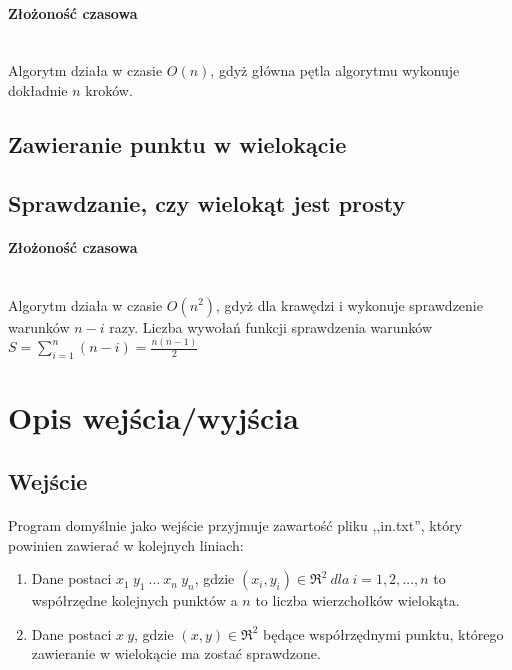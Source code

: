 \documentclass{article}
\begin{document}
\paragraph{Złożoność czasowa} \mbox{}\\
Algorytm działa w czasie \(O(n)\), gdyż główna pętla algorytmu wykonuje dokładnie \(n\) kroków.

\subsection{Zawieranie punktu w wielokącie}


\subsection{Sprawdzanie, czy wielokąt jest prosty}

\paragraph{Złożoność czasowa} \mbox{}\\
Algorytm działa w czasie $O(n^2)$, gdyż dla krawędzi i wykonuje sprawdzenie warunków $n-i$ razy. Liczba wywołań funkcji sprawdzenia warunków $S = \sum\limits_{i=1}^n (n-i) = \frac{n(n-1)}{2}$

\section{Opis wejścia/wyjścia}

\subsection{Wejście}

\paragraph{}
Program domyślnie jako wejście przyjmuje zawartość pliku ,,in.txt'', który powinien zawierać w kolejnych liniach:
\begin{enumerate}
\item Dane postaci \(x_1\ y_1\ ...\ x_n\ y_n\), gdzie \((x_i,y_i) \in \Re^{2} \ dla\ i=1,2,...,n\) to współrzędne kolejnych punktów a \(n\) to liczba wierzchołków wielokąta.
\item Dane postaci \(x\ y\), gdzie \((x,y) \in \Re^{2}\) będące współrzędnymi punktu, którego zawieranie w wielokącie ma zostać sprawdzone.
\end{enumerate}
\end{document}
